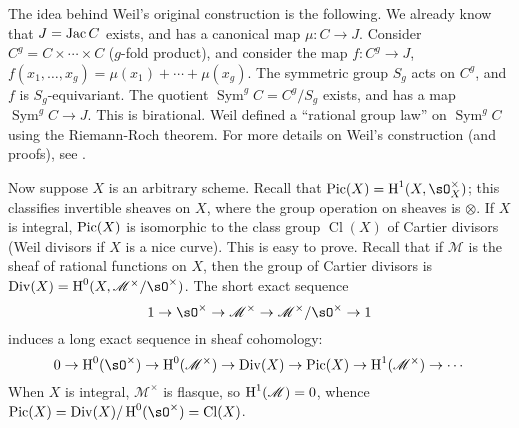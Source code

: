 The idea behind Weil's original construction is the following. We already 
know that $J=\operatorname{Jac} C$ exists, and has a canonical map $\mu:C\to J$. Consider 
$C^g=C\times\cdots\times C$ ($g$-fold product), and consider the map 
$f:C^g\to J$, $f(x_1,\dotsc,x_g)=\mu(x_1)+\cdots+\mu(x_g)$. The symmetric 
group $S_g$ acts on $C^g$, and $f$ is $S_g$-equivariant. The quotient 
$\operatorname{Sym}^g C = C^g/S_g$ exists, and has a map 
$\operatorname{Sym}^g C\to J$. This is birational. Weil defined a ``rational 
group law'' on $\operatorname{Sym}^g C$ using the Riemann-Roch theorem. For 
more details on Weil's construction (and proofs), see \cite[III.7]{mi-av}. 












Now suppose $X$ is an arbitrary scheme. Recall that 
$\picard(X)=\h^1(X,\sO_X^\times)$; this classifies invertible sheaves on 
$X$, where the group operation on sheaves is $\otimes$. If $X$ is integral, 
$\operatorname{Pic}(X)$ is isomorphic to the class group $\operatorname{Cl}(X)$ of Cartier 
divisors (Weil divisors if $X$ is a nice curve). This is easy to prove. Recall 
that if $\mathscr{M}$ is the sheaf of rational functions on $X$, then the 
group of Cartier divisors is $\divisor(X) = \h^0(X,\mathscr{M}^\times/\sO^\times)$. 
The short exact sequence 
\[
  1 \to \sO^\times \to \mathscr{M}^\times\to \mathscr{M}^\times/\sO^\times \to 1
\]
induces a long exact sequence in sheaf cohomology:
\[
  0 \to \h^0(\sO^\times) \to \h^0(\mathscr{M}^\times) \to \divisor(X) \to \picard(X) \to \h^1(\mathscr{M}^\times) \to \cdots
\]
When $X$ is integral, $\mathscr{M}^\times$ is flasque, so 
$\operatorname{H}^1(\mathscr{M}) = 0$, whence 
$\picard(X)=\divisor(X)/\h^0(\sO^\times) = \operatorname{Cl}(X)$. 

